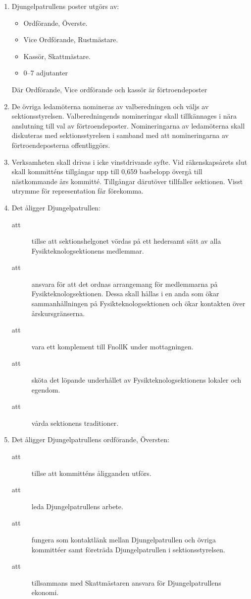 \documentclass[11pt,a4paper]{article}
\begin{document}
\begin{enumerate}[\thesubsection .1]

  \item Djungelpatrullens poster utgörs av:
    \begin{itemize}
      \item Ordförande, Överste.
      \item Vice Ordförande, Rustmästare.
      \item Kassör, Skattmästare.
      \item 0--7 adjutanter
    \end{itemize}
Där Ordförande, Vice ordförande och kassör är förtroendeposter

\item De övriga ledamöterna nomineras av valberedningen och väljs av sektionsstyrelsen. Valberedningends nomineringar skall tillkännages i nära anslutning till val av förtroendeposter. Nomineringarna av ledamöterna skall diskuteras med sektionsstyrelsen i samband med att nomineringarna av förtroendeposterna offentliggörs. 


  \item Verksamheten skall drivas i icke vinstdrivande syfte. Vid
  räkenskaps\-årets slut skall kommitténs tillgångar upp till 0,659
  basbelopp övergå till nästkommande års kommitté. Tillgångar
  därutöver tillfaller sektionen. Visst utrymme för representation får
  förekomma.

  \item Det åligger Djungelpatrullen:
    \begin{description}
      \item[att] tillse att sektionshelgonet vördas på ett hedersamt sätt av alla
	Fysikteknologsektionens medlemmar.   
      \item[att] ansvara för att det ordnas arrangemang för medlemmarna på
	Fysikteknologsektionen. Dessa skall hållas i en anda som ökar samman\-håll\-ning\-en på
	Fysikteknologsektionen och ökar kontakten över årskursgränserna.
      \item[att] vara ett komplement till FnollK under mottagningen. 
      \item[att] sköta det löpande underhållet av Fysikteknologsektionens lokaler och egendom.
      \item[att] vårda sektionens traditioner.

   
    \end{description}

  \item Det åligger Djungelpatrullens ordförande, Översten:
    \begin{description}
      \item[att] tillse att kommitténs åligganden utförs. 
      \item[att] leda Djungelpatrullens arbete.
      \item[att] fungera som kontaktlänk mellan Djungelpatrullen och
      övriga kommittéer samt företräda Djungelpatrullen i sektionsstyrelsen.
      \item[att] tillsammans med Skattmästaren ansvara för Djungelpatrullens ek\-o\-nomi.
    \end{description}


\end{enumerate}
\end{document}
